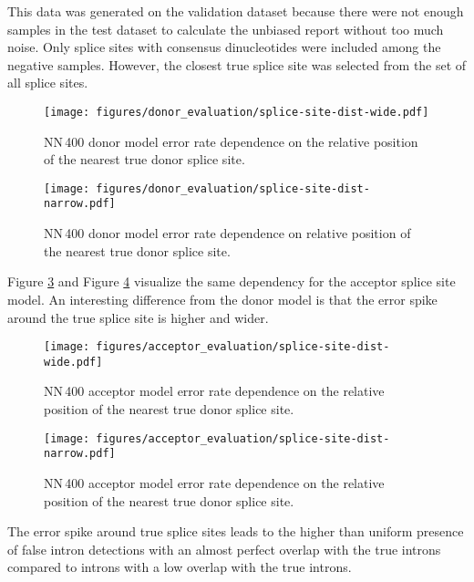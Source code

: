 This data was generated on the validation dataset because there were not enough
samples in the test dataset to calculate the unbiased report without too much
noise. Only splice sites with consensus dinucleotides were included among the
negative samples. However, the closest true splice site was selected from the
set of all splice sites.

\begin{figure}
  \centering
  \texttt{[image: figures/donor\_evaluation/splice-site-dist-wide.pdf]}
  \caption{NN\,400 donor model error rate dependence on the relative position
    of the nearest true donor splice site.}
  \label{fig:evaluation:donor-splice-site-dist-wide}
\end{figure}

\begin{figure}
  \centering
  \texttt{[image: figures/donor\_evaluation/splice-site-dist-narrow.pdf]}
  \caption{NN\,400 donor model error rate dependence on relative position of
    the nearest true donor splice site.}
  \label{fig:evaluation:donor-splice-site-dist-narrow}
\end{figure}

Figure \ref{fig:evaluation:acceptor-splice-site-dist-wide} and Figure
\ref{fig:evaluation:acceptor-splice-site-dist-narrow} visualize the same
dependency for the acceptor splice site model. An interesting difference from
the donor model is that the error spike around the true splice site is higher
and wider.

\begin{figure}
  \centering
  \texttt{[image: figures/acceptor\_evaluation/splice-site-dist-wide.pdf]}
  \caption{NN\,400 acceptor model error rate dependence on the relative
    position of the nearest true donor splice site.}
  \label{fig:evaluation:acceptor-splice-site-dist-wide}
\end{figure}

\begin{figure}
  \centering
  \texttt{[image: figures/acceptor\_evaluation/splice-site-dist-narrow.pdf]}
  \caption{NN\,400 acceptor model error rate dependence on the relative
    position of the nearest true donor splice site.}
  \label{fig:evaluation:acceptor-splice-site-dist-narrow}
\end{figure}

The error spike around true splice sites leads to the higher than uniform
presence of false intron detections with an almost perfect overlap with the
true introns compared to introns with a low overlap with the true introns.

